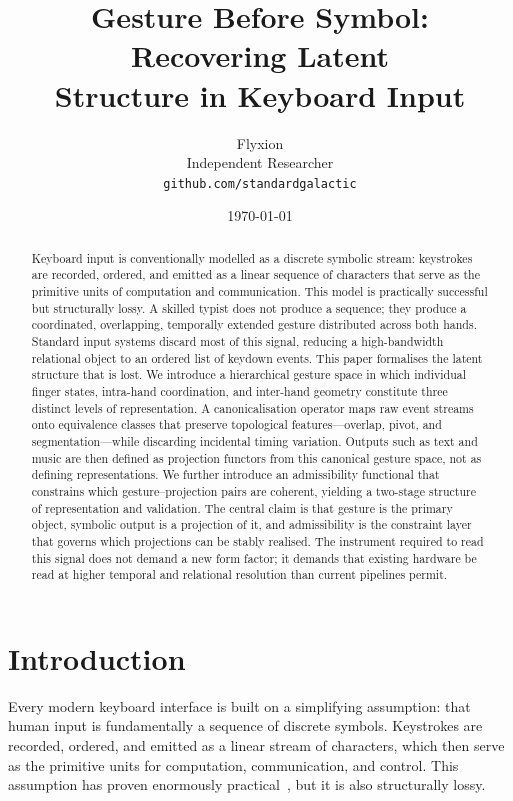 \documentclass[11pt, a4paper]{article}
\title{\textbf{Gesture Before Symbol: Recovering Latent\\
Structure in Keyboard Input}}
\author{Flyxion\\
\small Independent Researcher\\
\small \texttt{github.com/standardgalactic}}
\date{\today}
\begin{document}
\maketitle
\thispagestyle{empty}

\begin{abstract}
\noindent
Keyboard input is conventionally modelled as a discrete symbolic stream:
keystrokes are recorded, ordered, and emitted as a linear sequence of
characters that serve as the primitive units of computation and
communication. This model is practically successful but structurally
lossy. A skilled typist does not produce a sequence; they produce a
coordinated, overlapping, temporally extended gesture distributed across
both hands. Standard input systems discard most of this signal, reducing
a high-bandwidth relational object to an ordered list of keydown events.
This paper formalises the latent structure that is lost. We introduce a
hierarchical gesture space in which individual finger states, intra-hand
coordination, and inter-hand geometry constitute three distinct levels of
representation. A canonicalisation operator maps raw event streams onto
equivalence classes that preserve topological features---overlap, pivot,
and segmentation---while discarding incidental timing variation. Outputs
such as text and music are then defined as projection functors from this
canonical gesture space, not as defining representations. We further
introduce an admissibility functional that constrains which gesture--projection
pairs are coherent, yielding a two-stage structure of representation and
validation. The central claim is that gesture is the primary object,
symbolic output is a projection of it, and admissibility is the constraint
layer that governs which projections can be stably realised. The instrument
required to read this signal does not demand a new form factor; it demands
that existing hardware be read at higher temporal and relational resolution
than current pipelines permit.
\end{abstract}

\newpage

\section{Introduction}

Every modern keyboard interface is built on a simplifying assumption:
that human input is fundamentally a sequence of discrete symbols.
Keystrokes are recorded, ordered, and emitted as a linear stream of
characters, which then serve as the primitive units for computation,
communication, and control. This assumption has proven enormously
practical~\cite{mackenzie2002}, but it is also structurally lossy.
\end{document}
